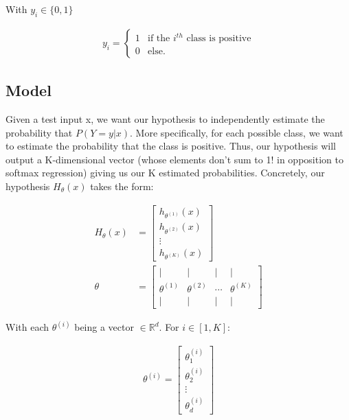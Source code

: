 With $y_{i} \in \{0, 1\}$

\begin{align}
y_{i} = \left\{
    \begin{array}{ll}
        1 & \mbox{if the } i^{th} \mbox{ class is positive} \\
        0 & \mbox{else.}
    \end{array}
\right.
\end{align}

\subsection{Model}

Given a test input x, we want our hypothesis to independently estimate the probability that $P(Y=y | x)$. More specifically, for each possible class, we want to estimate the probability that the class is positive. Thus, our hypothesis will output a K-dimensional vector (whose elements don't sum to 1! in opposition to softmax regression) giving us our K estimated probabilities. Concretely, our hypothesis $H_{\theta}(x)$ takes the form:

\begin{align}
	H_\theta(x) 
		&= \begin{bmatrix} 
			h_{\theta^{(1)}}(x) \\ 
			h_{\theta^{(2)}}(x) \\ 
			\vdots \\ 
			h_{\theta^{(K)}}(x) 
		\end{bmatrix} \\
	\theta &= \left[\begin{array}{cccc}| & | & | & | \\ \theta^{(1)} & \theta^{(2)} & \cdots & \theta^{(K)} \\ | & | & | & | \end{array}\right]
\end{align}


With each $\theta^{(i)}$ being a vector $\in \mathbb{R}^{d}$.
For $i \in [1, K]$:

\begin{align}
	\theta^{(i)} = \left[
		\begin{array}{cccc}
			\theta_{1}^{(i)} \\
			\theta_{2}^{(i)} \\
			\vdots \\
			\theta_{d}^{(i)}
		\end{array}\right]
\end{align}



